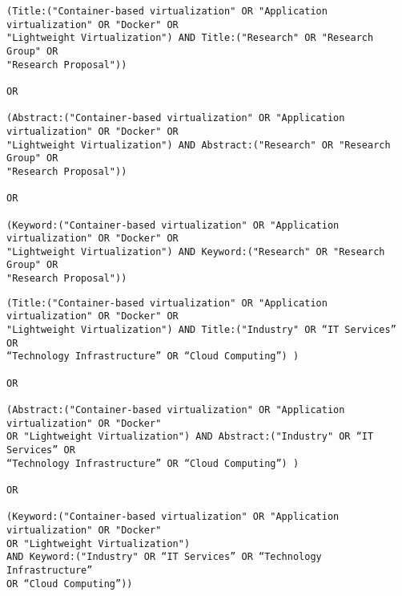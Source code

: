 \begin{tcolorbox}[
  colback=gray!5, 
  colframe=black!60, 
  title=Cadena de búsqueda en ACM para investigación, 
  fonttitle=\bfseries, 
  sharp corners=south
]
\scriptsize %
\begin{verbatim}
(Title:("Container-based virtualization" OR "Application virtualization" OR "Docker" OR 
"Lightweight Virtualization") AND Title:("Research" OR "Research Group" OR 
"Research Proposal"))

OR

(Abstract:("Container-based virtualization" OR "Application virtualization" OR "Docker" OR 
"Lightweight Virtualization") AND Abstract:("Research" OR "Research Group" OR 
"Research Proposal"))

OR

(Keyword:("Container-based virtualization" OR "Application virtualization" OR "Docker" OR 
"Lightweight Virtualization") AND Keyword:("Research" OR "Research Group" OR 
"Research Proposal"))
\end{verbatim}
\end{tcolorbox}

\begin{tcolorbox}[
  colback=gray!5, 
  colframe=black!60, 
  title=Cadena de búsqueda en ACM para industria, 
  fonttitle=\bfseries, 
  sharp corners=south
]
\scriptsize %
\begin{verbatim}
(Title:("Container-based virtualization" OR "Application virtualization" OR "Docker" OR 
"Lightweight Virtualization") AND Title:("Industry" OR “IT Services” OR 
“Technology Infrastructure” OR “Cloud Computing”) ) 

OR

(Abstract:("Container-based virtualization" OR "Application virtualization" OR "Docker" 
OR "Lightweight Virtualization") AND Abstract:("Industry" OR “IT Services” OR 
“Technology Infrastructure” OR “Cloud Computing”) )

OR

(Keyword:("Container-based virtualization" OR "Application virtualization" OR "Docker" 
OR "Lightweight Virtualization")
AND Keyword:("Industry" OR “IT Services” OR “Technology Infrastructure” 
OR “Cloud Computing”))

\end{verbatim}
\end{tcolorbox}

